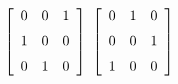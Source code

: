{$\left[ \begin {array}{ccc} 0&0&1\\\noalign{\medskip}1&0&0
\\\noalign{\medskip}0&1&0\end {array} \right]$ 
}
{$ \left[ \begin {array}{ccc} 0&1&0\\\noalign{\medskip}0&0&1
\\\noalign{\medskip}1&0&0\end {array} \right]$}
